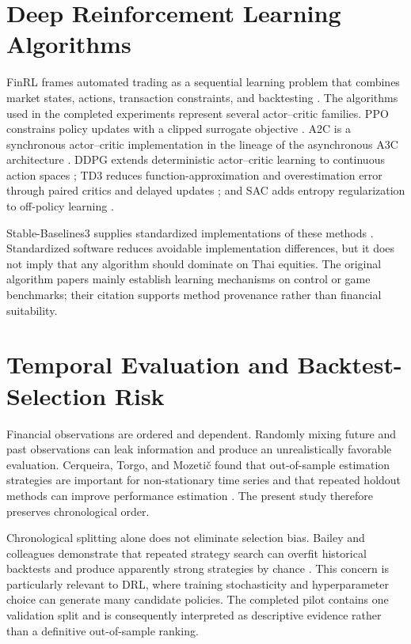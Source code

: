 \documentclass[12pt,a4paper,oneside]{book}
\begin{document}
\section{Deep Reinforcement Learning Algorithms}

FinRL frames automated trading as a sequential learning problem that combines market states, actions, transaction constraints, and backtesting \cite{liu2020finrl}. The algorithms used in the completed experiments represent several actor--critic families. PPO constrains policy updates with a clipped surrogate objective \cite{schulman2017ppo}. A2C is a synchronous actor--critic implementation in the lineage of the asynchronous A3C architecture \cite{mnih2016a3c}. DDPG extends deterministic actor--critic learning to continuous action spaces \cite{lillicrap2015ddpg}; TD3 reduces function-approximation and overestimation error through paired critics and delayed updates \cite{fujimoto2018td3}; and SAC adds entropy regularization to off-policy learning \cite{haarnoja2018sac}.

Stable-Baselines3 supplies standardized implementations of these methods \cite{raffin2021sb3}. Standardized software reduces avoidable implementation differences, but it does not imply that any algorithm should dominate on Thai equities. The original algorithm papers mainly establish learning mechanisms on control or game benchmarks; their citation supports method provenance rather than financial suitability.

\section{Temporal Evaluation and Backtest-Selection Risk}

Financial observations are ordered and dependent. Randomly mixing future and past observations can leak information and produce an unrealistically favorable evaluation. Cerqueira, Torgo, and Mozeti\v{c} found that out-of-sample estimation strategies are important for non-stationary time series and that repeated holdout methods can improve performance estimation \cite{cerqueira2020timeseries}. The present study therefore preserves chronological order.

Chronological splitting alone does not eliminate selection bias. Bailey and colleagues demonstrate that repeated strategy search can overfit historical backtests and produce apparently strong strategies by chance \cite{bailey2017backtest}. This concern is particularly relevant to DRL, where training stochasticity and hyperparameter choice can generate many candidate policies. The completed pilot contains one validation split and is consequently interpreted as descriptive evidence rather than a definitive out-of-sample ranking.
\end{document}
